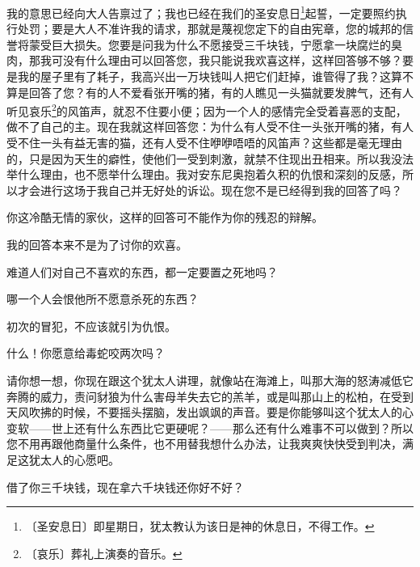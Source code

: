 \documentclass[12pt,UTF-8,openany]{ctexbook}
\begin{document}
\begin{normalsize}
\begin{description}[itemsep=1ex,leftmargin=4.5em,labelwidth=4em]
    \item[{\color{script-1-3} 沙义洛}]我的意思已经向大人告禀过了；我也已经在我们的圣安息日\footnote{〔圣安息日〕即星期日，犹太教认为该日是神的休息日，不得工作。}起誓，一定要照约执行处罚；要是大人不准许我的请求，那就是蔑视您定下的自由宪章，您的城邦的信誉将蒙受巨大损失。您要是问我为什么不愿接受三千块钱，宁愿拿一块腐烂的臭肉，那我可没有什么理由可以回答您，我只能说我欢喜这样，这样回答够不够？要是我的屋子里有了耗子，我高兴出一万块钱叫人把它们赶掉，谁管得了我？这算不算是回答了您？有的人不爱看张开嘴的猪，有的人瞧见一头猫就要发脾气，还有人听见哀乐\footnote{〔哀乐〕葬礼上演奏的音乐。}的风笛声，就忍不住要小便；因为一个人的感情完全受着喜恶的支配，做不了自己的主。现在我就这样回答您：为什么有人受不住一头张开嘴的猪，有人受不住一头有益无害的猫，还有人受不住咿咿唔唔的风笛声？这些都是毫无理由的，只是因为天生的癖性，使他们一受到刺激，就禁不住现出丑相来。所以我没法举什么理由，也不愿举什么理由。我对安东尼奥抱着久积的仇恨和深刻的反感，所以才会进行这场于我自己并无好处的诉讼。现在您不是已经得到我的回答了吗？
    
    \item[{\color{script-1-4} 巴萨尼奥}]你这冷酷无情的家伙，这样的回答可不能作为你的残忍的辩解。
    
    \item[{\color{script-1-3} 沙义洛}]我的回答本来不是为了讨你的欢喜。
    
    \item[{\color{script-1-4} 巴萨尼奥}]难道人们对自己不喜欢的东西，都一定要置之死地吗？
    
    \item[{\color{script-1-3} 沙义洛}]哪一个人会恨他所不愿意杀死的东西？
    
    \item[{\color{script-1-4} 巴萨尼奥}]初次的冒犯，不应该就引为仇恨。
    
    \item[{\color{script-1-3} 沙义洛}]什么！你愿意给毒蛇咬两次吗？
    
    \item[{\color{script-1-1} 安东尼奥}]请你想一想，你现在跟这个犹太人讲理，就像站在海滩上，叫那大海的怒涛减低它奔腾的威力，责问豺狼为什么害母羊失去它的羔羊，或是叫那山上的松柏，在受到天风吹拂的时候，不要摇头摆脑，发出飒飒的声音。要是你能够叫这个犹太人的心变软——世上还有什么东西比它更硬呢？——那么还有什么难事不可以做到？所以您不用再跟他商量什么条件，也不用替我想什么办法，让我爽爽快快受到判决，满足这犹太人的心愿吧。
    
    \item[{\color{script-1-4} 巴萨尼奥}]借了你三千块钱，现在拿六千块钱还你好不好？
    

\end{description}
\end{normalsize}
\end{document}
